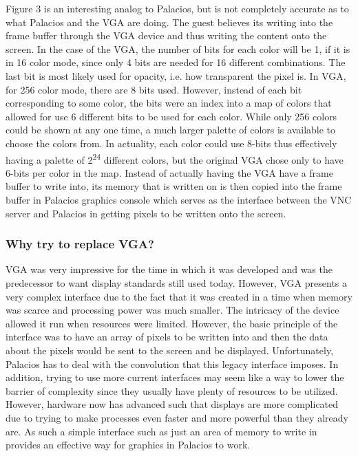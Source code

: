 \documentclass{acm_proc_article-sp}
\begin{document}
 Figure 3 is an interesting analog to Palacios, but is not completely accurate as to what Palacios and the VGA are doing. The guest believes its writing into the frame buffer through the VGA device and thus writing the content onto the screen. In the case of the VGA, the number of bits for each color will be 1, if it is in 16 color mode, since only 4 bits are needed for 16 different combinations. The last bit is most likely used for opacity, i.e. how transparent the pixel is. In VGA, for 256 color mode, there are 8 bits used. However, instead of each bit corresponding to some color, the bits were an index into a map of colors that allowed for use 6 different bits to be used for each color. While only 256 colors could be shown at any one time, a much larger palette of colors is available to choose the colors from. In actuality, each color could use 8-bits thus effectively having a palette of 2\textsuperscript{24} different colors, but the original VGA chose only to have 6-bits per color in the map. Instead of actually having the VGA have a frame buffer to write into, its memory that is written on is then copied into the frame buffer in Palacios graphics console which serves as the interface between the VNC server and Palacios in getting pixels to be written onto the screen. 
 
 \subsubsection{Why try to replace VGA?}
 VGA was very impressive for the time in which it was developed and was the predecessor to want display standards still used today. However, VGA presents a very complex interface due to the fact that it was created in a time when memory was scarce and processing power was much smaller. The intricacy of the device allowed it run when resources were limited. However, the basic principle of the interface was to have an array of pixels to be written into and then the data about the pixels would be sent to the screen and be displayed. Unfortunately, Palacios has to deal with the convolution that this legacy interface imposes. In addition, trying to use more current interfaces may seem like a way to lower the barrier of complexity since they usually have plenty of resources to be utilized. However, hardware now has advanced such that displays are more complicated due to trying to make processes even faster and more powerful than they already are. As such a simple interface such as just an area of memory to write in provides an effective way for graphics in Palacios to work.  
 
\end{document}
